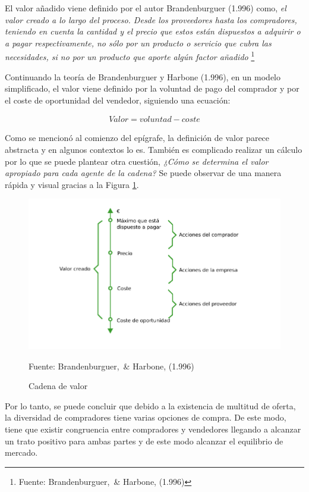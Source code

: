 El valor añadido viene definido por el autor Brandenburguer (1.996) como, \emph{el valor creado a lo largo del proceso. Desde los proveedores hasta los compradores, teniendo en cuenta la cantidad y el precio que estos están dispuestos a adquirir o a pagar respectivamente, no sólo por un producto o servicio que cubra las necesidades, si no por un producto que aporte algún factor añadido} \footnote{Fuente: Brandenburguer, \& Harbone, (1.996)} 

Continuando la teoría de Brandenburguer y Harbone (1.996), en un modelo simplificado, el valor viene definido por la voluntad de pago del comprador y por el coste de oportunidad del vendedor, siguiendo una ecuación: 

\begin{gather*}
    Valor = voluntad - coste
\end{gather*}

Como se mencionó al comienzo del epígrafe, la definición de valor parece abstracta y en algunos contextos lo es. También es complicado realizar un cálculo por lo que se puede plantear otra cuestión, \emph{¿Cómo se determina el valor apropiado para cada agente de la cadena?} Se puede observar de una manera rápida y visual gracias a la Figura \ref{fig:Cadena de valor}.

\begin{figure}[!h] 
\caption{Cadena de valor} 
\centering \includegraphics[width=150mm]{capitulos/graficos/cadenaValor} 
\label{fig:Cadena de valor} 

	\footnotesize
	Fuente: Brandenburguer, \& Harbone, (1.996)

\end{figure}

Por lo tanto, se puede concluir que debido a la existencia de multitud de oferta, la diversidad de compradores tiene varias opciones de compra. De este modo, tiene que existir congruencia entre compradores y vendedores llegando a alcanzar un trato positivo para ambas partes y de este modo alcanzar el equilibrio de mercado.

